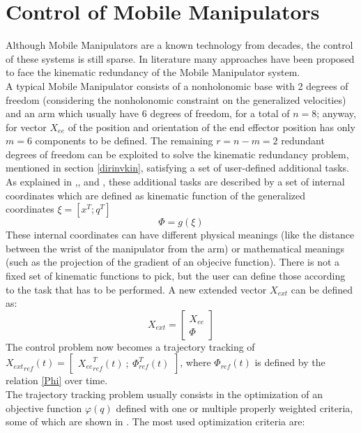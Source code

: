 \section{Control of Mobile Manipulators}
Although Mobile Manipulators are a known technology from decades, the control of these systems is still sparse. In literature many approaches have been proposed to face the kinematic redundancy of the Mobile Manipulator system. \\
A typical Mobile Manipulator consists of a nonholonomic base with 2 degrees of freedom (considering the nonholonomic constraint on the generalized velocities) and an arm which usually have 6 degrees of freedom, for a total of $n=8$; anyway, for vector $X_{ee}$ of the position and orientation of the end effector position has only $m=6$ components to be defined. The remaining $r=n-m=2$ redundant degrees of freedom can be exploited to solve the kinematic redundancy problem, mentioned in section \ref{dirinvkin}, satisfying a set of user-defined additional tasks. As explained in \cite{bayle},\cite{seraji1998},\cite{seraji1993} and \cite{mikschschroeder}, these additional tasks are described by a set of internal coordinates which are defined as kinematic function of the generalized coordinates $\xi=\left[x^T ; q^T\right]$
\begin{equation}\label{Phi}
	\Phi=g(\xi)
\end{equation}
These internal coordinates can have different physical meanings (like the distance between the wrist of the manipulator from the arm) or mathematical meanings (such as the projection of the gradient of an objecive function). There is not a fixed set of kinematic functions to pick, but the user can define those according to the task that has to be performed. A new extended vector $X_{ext}$ can be defined as:
\begin{equation}
	X_{ext}=\left[\begin{matrix}
	X_{ee} \\ \Phi
	\end{matrix}\right]
\end{equation}
The control problem now becomes a trajectory tracking of ${X_{ext}}_{ref}(t) =\left[\begin{matrix} {X_{ee}}_{ref}^T(t) \ ;\ \Phi_{ref}^T(t) \end{matrix}\right]$, where $ \Phi_{ref}(t)$ is defined by the relation \ref{Phi} over time.\\
The trajectory tracking problem usually consists in the optimization of an objective function $\varphi(q)$ defined with one or multiple properly weighted criteria, some of which are shown in \cite{multicriteria}. The most used optimization criteria are: 
